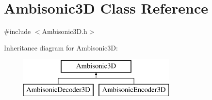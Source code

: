 \hypertarget{class_ambisonic3_d}{\section{Ambisonic3\-D Class Reference}
\label{class_ambisonic3_d}
}


{\ttfamily \#include $<$Ambisonic3\-D.\-h$>$}

Inheritance diagram for Ambisonic3\-D\-:\begin{figure}[H]
\begin{center}
\leavevmode
\includegraphics[height=2.000000cm]{class_ambisonic3_d}
\end{center}
\end{figure}
